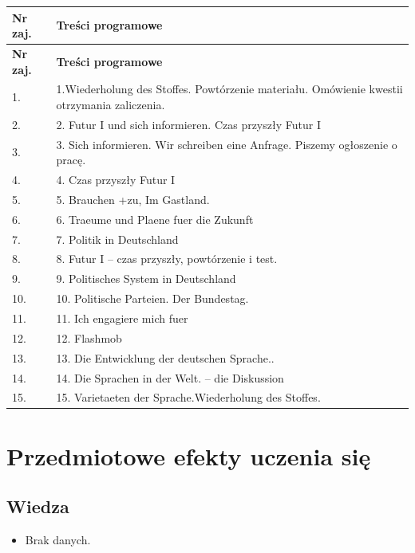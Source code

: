 \documentclass[12pt, a4paper]{article}
\newcommand{\thdrule}{\noalign{\global\setlength{\extrarowheight}{0pt}}}
\newcommand{\thdend}{\noalign{\global\setlength{\extrarowheight}{3pt}}}
\begin{document}
{\scriptsize
\begin{longtable}{m{1.5cm}m{14.5cm}}
\thdrule\toprule
\rowcolor{pjatkRed} {\color{white}\textbf{Nr zaj.}} & {\color{white}\textbf{Treści programowe}} \\
\midrule\thdend
\endfirsthead
\thdrule\toprule
\rowcolor{pjatkRed} {\color{white}\textbf{Nr zaj.}} & {\color{white}\textbf{Treści programowe}} \\
\midrule\thdend
\endhead
  \rowcolor{tableRowLight} 1. & 1.Wiederholung des Stoffes. Powtórzenie materiału. Omówienie kwestii otrzymania zaliczenia. \\
  \rowcolor{tableRowAlt} 2. & 2. Futur I und sich informieren. Czas przyszły Futur I \\
  \rowcolor{tableRowLight} 3. & 3. Sich informieren. Wir schreiben eine Anfrage. Piszemy ogłoszenie o pracę. \\
  \rowcolor{tableRowAlt} 4. & 4. Czas przyszły Futur I \\
  \rowcolor{tableRowLight} 5. & 5. Brauchen +zu, Im Gastland. \\
  \rowcolor{tableRowAlt} 6. & 6. Traeume und Plaene fuer die Zukunft \\
  \rowcolor{tableRowLight} 7. & 7. Politik in Deutschland \\
  \rowcolor{tableRowAlt} 8. & 8. Futur I – czas przyszły, powtórzenie i test. \\
  \rowcolor{tableRowLight} 9. & 9. Politisches System in Deutschland \\
  \rowcolor{tableRowAlt} 10. & 10. Politische Parteien. Der Bundestag. \\
  \rowcolor{tableRowLight} 11. & 11. Ich engagiere mich fuer \\
  \rowcolor{tableRowAlt} 12. & 12. Flashmob \\
  \rowcolor{tableRowLight} 13. & 13. Die Entwicklung der deutschen Sprache.. \\
  \rowcolor{tableRowAlt} 14. & 14. Die Sprachen in der Welt. – die Diskussion \\
  \rowcolor{tableRowLight} 15. & 15. Varietaeten der Sprache.Wiederholung des Stoffes. \\
\bottomrule
\end{longtable}}

\section{Przedmiotowe efekty uczenia się}

\subsection*{Wiedza}
\begin{itemize}
  \item Brak danych.
\end{itemize}
\end{document}
